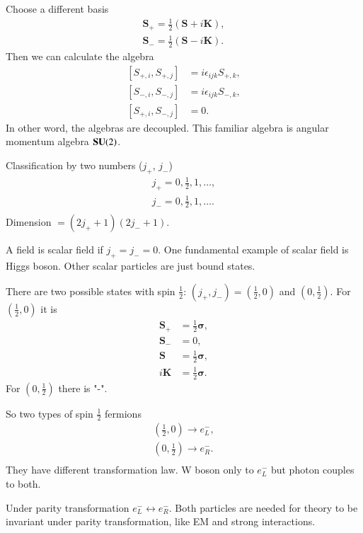 Choose a different basis
\begin{align}
   \pmb{S}_+ = \frac{1}{2} \left( \pmb{S} + i \pmb{K} \right), \\
   \pmb{S}_- = \frac{1}{2} \left( \pmb{S} - i \pmb{K} \right).
\end{align}
Then we can calculate the algebra
\begin{align}
   \left[ S_{+, i}, S_{+, j} \right] &= i \epsilon_{ijk} S_{+, k}, \\
   \left[ S_{-, i}, S_{-, j} \right] &= i \epsilon_{ijk} S_{-, k}, \\
   \left[ S_{+, i}, S_{-, j} \right] &= 0.
\end{align}
In other word, the algebras are decoupled. This familiar algebra is angular momentum algebra $\mathbf{SU}(2)$.

Classification by two numbers ($j_+$, $j_-$)
\begin{align*}
   j_+ = 0, \frac{1}{2}, 1, \dots, \\
   j_- = 0, \frac{1}{2}, 1, \dots. \\
\end{align*}
Dimension $=(2j_+ + 1) (2j_- + 1)$. 

A field is scalar field if $j_+ = j_- = 0$. One fundamental example of scalar field is Higgs boson. Other scalar particles are just bound states.

There are two possible states with spin $\frac{1}{2}$: $(j_+, j_-) = (\frac{1}{2}, 0)$ and $(0, \frac{1}{2})$. For  $(\frac{1}{2}, 0)$ it is
\begin{align*}
   \pmb{S}_+ &= \frac{1}{2} \pmb{\sigma}, \\
   \pmb{S}_- &= 0, \\
   \pmb{S} &= \frac{1}{2} \pmb{\sigma}, \\
   i\pmb{K} &=  \frac{1}{2} \pmb{\sigma} .
\end{align*}
For $(0, \frac{1}{2})$ there is "-".

So two types of spin $\frac{1}{2}$ fermions
\begin{align*}
   \left(\frac{1}{2}, 0\right) \rightarrow e^-_L, \\
   \left(0, \frac{1}{2}\right) \rightarrow e^-_R. \\
\end{align*}
They have different transformation law. W boson only to $e^-_L$ but photon couples to both. 

Under parity transformation $e^-_L \leftrightarrow e^-_R$. Both particles are needed for theory to be invariant under parity transformation, like EM and strong interactions.
